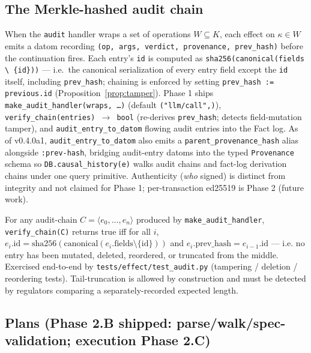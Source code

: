 \documentclass[anon]{nesy2026}   %
\newcommand{\C}[1]{\texttt{#1}}
\begin{document}
\subsection{The Merkle-hashed audit chain}\label{sec:audit}

When the \C{audit} handler wraps a set of operations $W \subseteq K$, each effect on $\kappa \in W$ emits a datom recording \C{(op, args, verdict, provenance, prev\_hash)} before the continuation fires. Each entry's \C{id} is computed as \C{sha256(canonical(fields \textbackslash{} \{id\}))} --- i.e.\ the canonical serialization of every entry field except the \C{id} itself, including \C{prev\_hash}; chaining is enforced by setting \C{prev\_hash := previous.id} (Proposition~\ref{prop:tamper}). Phase 1 ships \C{make\_audit\_handler(wraps, \dots)} (default \C{("llm/call",)}), \C{verify\_chain(entries) $\to$ bool} (re-derives \C{prev\_hash}; detects field-mutation tamper), and \C{audit\_entry\_to\_datom} flowing audit entries into the Fact log. As of v0.4.0a1, \C{audit\_entry\_to\_datom} also emits a \C{parent\_provenance\_hash} alias alongside \C{:prev-hash}, bridging audit-entry datoms into the typed \C{Provenance} schema so \C{DB.causal\_history(e)} walks audit chains and fact-log derivation chains under one query primitive. Authenticity (\emph{who} signed) is distinct from integrity and not claimed for Phase 1; per-transaction ed25519 is Phase 2 (future work).

\begin{proposition}\label{prop:tamper}
For any audit-chain $C = \langle e_0, \dots, e_n \rangle$ produced by \C{make\_audit\_handler}, \C{verify\_chain(C)} returns true iff for all $i$, $e_i.\text{id} = \text{sha256}(\text{canonical}(e_i.\text{fields} \setminus \{\text{id}\}))$ and $e_i.\text{prev\_hash} = e_{i-1}.\text{id}$ --- i.e. no entry has been mutated, deleted, reordered, or truncated from the middle. Exercised end-to-end by \C{tests/effect/test\_audit.py} (tampering / deletion / reordering tests). Tail-truncation is allowed by construction and must be detected by regulators comparing a separately-recorded expected length.
\end{proposition}

\subsection{Plans (Phase 2.B shipped: parse/walk/spec-validation; execution Phase 2.C)}\label{sec:plans}
\end{document}
